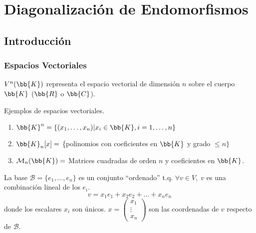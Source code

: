 \chapter{Diagonalización de Endomorfismos}

\section{Introducción}
\subsection{Espacios Vectoriales}

\begin{notacion}
$V^n(\bb{K})$ representa el espacio vectorial de dimensión $n$ sobre el cuerpo $\bb{K}$ ($\bb{R}$ o $\bb{C}$).
\end{notacion}

\begin{ejemplo} Ejemplos de espacios vectoriales.
\begin{enumerate}
    \item $\bb{K}^n = \left\{ (x_1, \dots , x_n) | x_i \in \bb{K}, i=1, \dots, n \right\}$

    \item $\bb{K}_n[x] = $ \{polinomios con coeficientes en $\bb{K}$ y grado $\leq n\} $

    \item $\mathcal{M}_n(\bb{K}) = $ Matrices cuadradas de orden $n$ y coeficientes en $\bb{K}$.
\end{enumerate}
\end{ejemplo}


\begin{definicion}[Bases]
    La base $\mathcal{B}=\{e_1, \dots, e_n\}$ es un conjunto ``ordenado'' t.q. $\forall v \in V, \; v$ es una combinación lineal de los $e_i$.
    $$v = x_1e_1 + x_2e_2 + \dots + x_ne_n$$
    donde los escalares $x_i$ son únicos.
    $\displaystyle x =
        \left( \begin{array}{c}
             x_1    \\
             \vdots \\
             x_n
        \end{array}\right)$
    son las coordenadas de $v$ respecto de $\mathcal{B}$.
\end{definicion}

